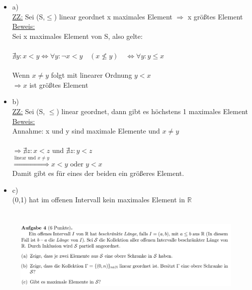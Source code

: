 \documentclass[a4paper]{scrartcl}
\begin{document}
    \begin{itemize}
        \item a)\\
            \underline{ZZ:} Sei (S,$\leq$) linear geordnet x maximales Element $\Rightarrow$ x größtes Element\\
            \underline{Beweis:}\\
                Sei x maximales Element von S, also gelte:\\
                \\$\nexists y: x < y \Leftrightarrow \forall y: \neg x < y \quad (x \nleq y) \quad \Leftrightarrow \forall y: y \leq x$\\
                \\Wenn  $x \neq y$ folgt mit linearer Ordnung $y < x$\\
                $\Rightarrow x$ ist größtes Element\\

        \item b)\\
            \underline{ZZ:} Sei (S, $\leq$) linear geordnet, dann gibt es höchstens 1 maximales Element\\
            \underline{Beweis:}\\
                Annahme: x und y sind maximale Elemente und $x \neq y$\\
                \\$\Rightarrow \nexists z: x < z$ und $\nexists z: y < z$\\
                $\overset{\text{linear und } x \neq y}{\Rightarrow} x < y \text{ oder } y < x$\\
                Damit gibt es für eines der beiden ein größeres Element.\\

        \item c)\\
            (0,1) hat im offenen Intervall kein maximales Element in $\mathds{R}$\\
    \end{itemize}



\section*{}%
\label{sec:aufgabe_4}

    \begin{figure}[H]
        \centering
        \includegraphics[scale=0.3]{./A-4.png}
        \label{fig:}
    \end{figure}
\end{document}
